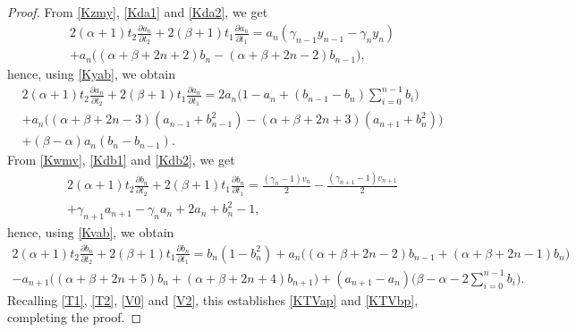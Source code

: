 \documentclass[10pt, reqno]{amsart}
\numberwithin{equation}{section}
\numberwithin{equation}{section}
\begin{document}
\begin{proof}
From \eqref{Kzmy}, \eqref{Kda1} and \eqref{Kda2}, we get
\begin{multline*}
2(\alpha+1)t_2\frac{\partial a_n}{\partial t_2}+2(\beta+1)t_1\frac{\partial a_n}{\partial t_1}=a_n(\gamma_{n-1}y_{n-1}-\gamma_{n}y_n)\\
+a_n\big((\alpha+\beta+2n+2)b_n-(\alpha+\beta+2n-2)b_{n-1}\big),
\end{multline*}
hence, using \eqref{Kyab}, we obtain
\begin{multline*}
2(\alpha+1)t_2\frac{\partial a_n}{\partial t_2}+2(\beta+1)t_1\frac{\partial a_n}{\partial t_1}=2a_n\Big(1-a_n+(b_{n-1}-b_n)\sum_{i=0}^{n-1}b_i\Big)\\
+a_n\Big((\alpha+\beta+2n-3)(a_{n-1}+b_{n-1}^2)-(\alpha+\beta+2n+3)(a_{n+1}+b_n^2)\Big)\\
+(\beta-\alpha)a_n(b_n-b_{n-1}).
\end{multline*}
From \eqref{Kwmv}, \eqref{Kdb1} and \eqref{Kdb2}, we get
\begin{multline*}
2(\alpha+1)t_2\frac{\partial b_n}{\partial t_2}+2(\beta+1)t_1\frac{\partial b_n}{\partial t_1}=\frac{(\gamma_n-1)v_n}{2}-\frac{(\gamma_{n+1}-1)v_{n+1}}{2}\\
+\gamma_{n+1}a_{n+1}-\gamma_na_n+2a_n+b_n^2-1,
\end{multline*}
hence, using \eqref{Kvab}, we obtain
\begin{multline*}
2(\alpha+1)t_2\frac{\partial b_n}{\partial t_2}+2(\beta+1)t_1\frac{\partial b_n}{\partial t_1}=b_n(1-b_n^2)
+a_n\Big((\alpha+\beta+2n-2)b_{n-1}+(\alpha+\beta+2n-1)b_n\Big)\nonumber\\
-a_{n+1}\Big((\alpha+\beta+2n+5)b_n+(\alpha+\beta+2n+4)b_{n+1}\Big)
+(a_{n+1}-a_n)\Big(\beta-\alpha-2\sum_{i=0}^{n-1}b_i\Big).
\end{multline*}
Recalling \eqref{T1}, \eqref{T2}, \eqref{V0} and \eqref{V2}, this establishes \eqref{KTVap} and \eqref{KTVbp}, completing the proof.
\end{proof}
\end{document}
